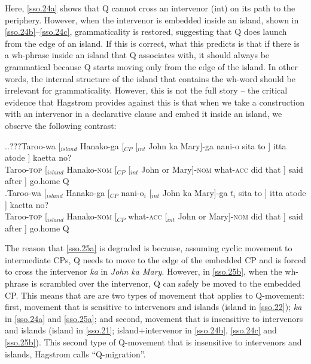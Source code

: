 \documentclass[charis]{glossa}
\begin{document}
Here, \ref{sso.24a} shows that Q cannot cross an intervenor (int) on its path to the periphery. However, when the intervenor is embedded inside an island, shown in \ref{sso.24b}--\ref{sso.24c}, grammaticality is restored, suggesting that Q does launch from the edge of an island. If this is correct, what this predicts is that if there is a wh-phrase inside an island that Q associates with, it should always be grammatical because Q starts moving only from the edge of the island. In other words, the internal structure of the island that contains the wh-word should be irrelevant for grammaticality. However, this is not the full story -- the critical evidence that Hagstrom provides against this is that when we take a construction with an intervenor in a declarative clause and embed it inside an island, we observe the following contrast:

\ex.\ag.???\label{sso.25a}Taroo-wa [$_{island}$ Hanako-ga [$_{CP}$ [$_{int}$ John ka Mary]-ga nani-o sita to ] itta atode ] kaetta no?\\
   Taroo-\textsc{top} [$_{island}$ Hanako-\textsc{nom} [$_{CP}$ [$_{int}$ John or Mary]-\textsc{nom} what-\textsc{acc} did that ] said after ] go.home Q\\
   \bg.\label{sso.25b}Taroo-wa [$_{island}$ Hanako-ga [$_{CP}$ nani-o$_i$ [$_{int}$ John ka Mary]-ga $t_i$ sita to ] itta atode ] kaetta no?\\
   Taroo-\textsc{top} [$_{island}$ Hanako-\textsc{nom} [$_{CP}$ what-\textsc{acc} [$_{int}$ John or Mary]-\textsc{nom} {} did that ] said after ] go.home Q\\

The reason that \ref{sso.25a} is degraded is because, assuming cyclic movement to intermediate CPs, Q needs to move to the edge of the embedded CP and is forced to cross the intervenor \textit{ka} in \textit{John ka Mary}. However, in \ref{sso.25b}, when the wh-phrase is scrambled over the intervenor, Q can safely be moved to the embedded CP. This means that are are two types of movement that applies to Q-movement: first, movement that is sensitive to intervenors and islands (island in \ref{sso.22}); \textit{ka} in \ref{sso.24a} and \ref{sso.25a}; and second, movement that is insensitive to intervenors and islands (island in \ref{sso.21}; island+intervenor in \ref{sso.24b}, \ref{sso.24c} and \ref{sso.25b}). This second type of Q-movement that is insensitive to intervenors and islands, Hagstrom calls ``Q-migration''.
\end{document}
